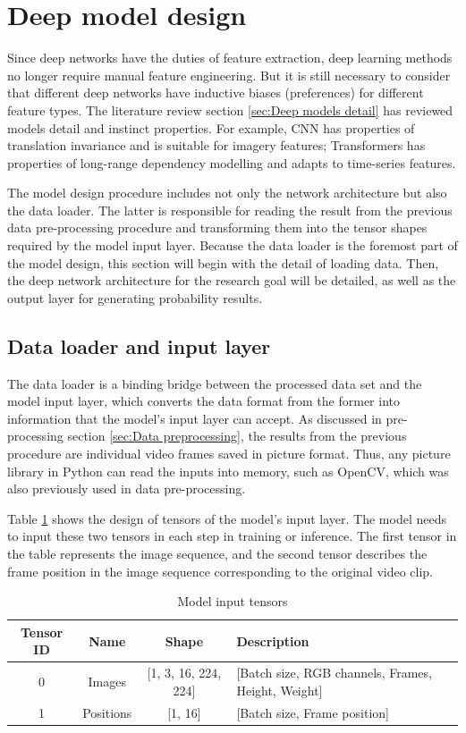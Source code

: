 \section{Deep model design}
\label{sec:Deep model design}
Since deep networks have the duties of feature extraction, deep learning methods no longer require manual feature engineering.
But it is still necessary to consider that different deep networks have inductive biases (preferences) for different feature types.
The literature review section \ref{sec:Deep models detail} has reviewed models detail and instinct properties.
For example, CNN has properties of translation invariance and is suitable for imagery features; Transformers has properties of long-range dependency modelling and adapts to time-series features.

The model design procedure includes not only the network architecture but also the data loader.
The latter is responsible for reading the result from the previous data pre-processing procedure and transforming them into the tensor shapes required by the model input layer.
Because the data loader is the foremost part of the model design, this section will begin with the detail of loading data.
Then, the deep network architecture for the research goal will be detailed, as well as the output layer for generating probability results.

\subsection{Data loader and input layer}
The data loader is a binding bridge between the processed data set and the model input layer, which converts the data format from the former into information that the model's input layer can accept.
As discussed in pre-processing section \ref{sec:Data preprocessing}, the results from the previous procedure are individual video frames saved in picture format.
Thus, any picture library in Python can read the inputs into memory, such as OpenCV, which was also previously used in data pre-processing.

Table \ref{tab:Model input tensors} shows the design of tensors of the model's input layer.
The model needs to input these two tensors in each step in training or inference.
The first tensor in the table represents the image sequence, and the second tensor describes the frame position in the image sequence corresponding to the original video clip.

\begin{table}[!ht]
\renewcommand{\arraystretch}{1.6}
\begin{tabularx}{\textwidth}{|c|c|c|X|}
\hline
Tensor ID & Name           & Shape                    & Description                                            \\ \hline
0         & Images   & {[}1, 3, 16, 224, 224{]} & {[}Batch size, RGB channels, Frames, Height, Weight{]} \\ \hline
1         & Positions & {[}1, 16{]}              & {[}Batch size, Frame position{]}                       \\ \hline
\end{tabularx}
\caption{Model input tensors}
\label{tab:Model input tensors}
\end{table}

